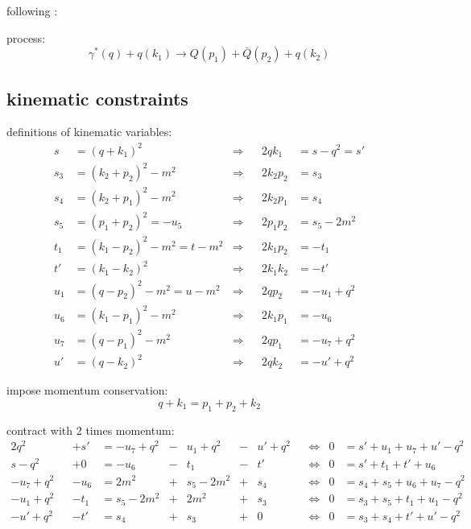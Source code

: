 following \cite{PhysRevD.40.54,van_neerven_dimensional_1986,Marco}:

process:
\begin{equation}
\gamma^*(q) + q(k_1) \rightarrow Q(p_1)+\bar{Q}(p_2) + q(k_2)
\end{equation}

\subsection{kinematic constraints}

definitions of kinematic variables:
\begin{align}
s &= (q+k_1)^2 &\Rightarrow& &2qk_1 &= s-q^2 = s'\\
s_3 &= (k_2+p_2)^2-m^2  &\Rightarrow& &2k_2p_2 &= s_3\\
s_4 &= (k_2+p_1)^2-m^2  &\Rightarrow& &2k_2p_1 &= s_4\\
s_5 &= (p_1+p_2)^2 = -u_5  &\Rightarrow& &2p_1p_2 &= s_5-2m^2\\
t_1 &= (k_1-p_2)^2-m^2 = t - m^2  &\Rightarrow& &2k_1p_2 &=-t_1\\
t' &= (k_1-k_2)^2  &\Rightarrow& &2k_1k_2 &= -t'\\
u_1 &= (q-p_2)^2-m^2 = u - m^2  &\Rightarrow& &2qp_2 &=-u_1+q^2\\
u_6 &= (k_1-p_1)^2 - m^2  &\Rightarrow& &2k_1p_1 &=-u_6\\
u_7 &= (q-p_1)^2 - m^2  &\Rightarrow& &2qp_1 &=-u_7+q^2\\
u' &= (q-k_2)^2  &\Rightarrow& &2qk_2 &=-u'+q^2
\end{align}

impose momentum conservation:
\begin{equation}
q+k_1 = p_1+p_2+k_2
\end{equation}

contract with 2 times momentum:
\begin{align}
2q^2 && +s' &=-u_7+q^2 &-& u_1+q^2 &-& u'+q^2 &&\Leftrightarrow &0 &=s'+u_1+u_7+u'-q^2 \label{eq:MomCon3wq} \\
s-q^2 && +0 &= -u_6 &-& t_1 &-& t' &&\Leftrightarrow &0 &= s'+t_1+t'+u_6 \label{eq:MomCon3wk1}\\
-u_7+q^2 && -u_6 &= 2m^2 &+& s_5-2m^2 &+& s_4 &&\Leftrightarrow &0 &= s_4+s_5+u_6+u_7-q^2 \label{eq:MomCon3wp1}\\
-u_1+q^2 && -t_1 &= s_5-2m^2 &+& 2m^2 &+& s_3 &&\Leftrightarrow &0 &= s_3+s_5+t_1+u_1-q^2 \label{eq:MomCon3wp2}\\
-u'+q^2 && -t' &= s_4 &+& s_3 &+& 0 &&\Leftrightarrow &0 &= s_3+s_4+t'+u'-q^2 \label{eq:MomCon3wk2}
\end{align}

